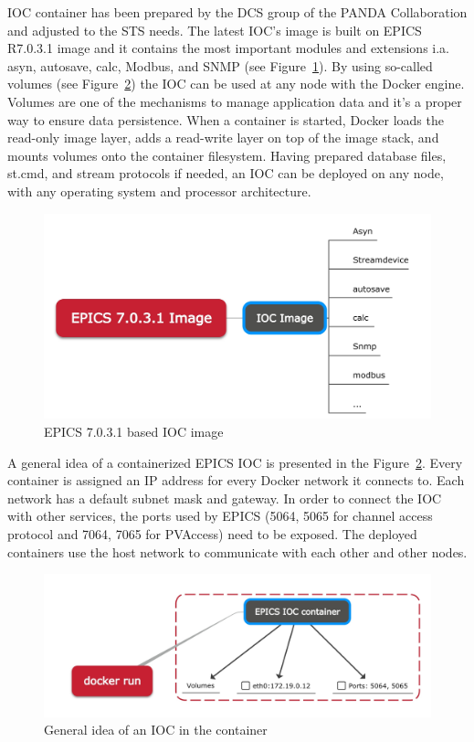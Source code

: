 IOC container has been prepared by the \gls{DCS} group of the \gls{PANDA} Collaboration and adjusted to the \gls{STS} needs. The latest \gls{IOC}'s image is built on EPICS R7.0.3.1 image and it contains the most important modules and extensions i.a. asyn, autosave, calc, Modbus, and SNMP (see Figure~\ref{fig_ioc1}). By using so-called volumes (see Figure~\ref{fig_doc}) the \gls{IOC} can be used at any node with the Docker engine. Volumes are one of the mechanisms to manage application data and it's a proper way to ensure data persistence. When a container is started, Docker loads the read-only image layer, adds a read-write layer on top of the image stack, and mounts volumes onto the container filesystem. Having prepared database files, st.cmd, and stream protocols if needed, an \gls{IOC} can be deployed on any node, with any operating system and processor architecture.
\begin{figure}[!h]
\centering
\includegraphics[width=0.7\columnwidth]{Chapter4/images/epics_ioc.jpg}
\caption{EPICS 7.0.3.1 based \gls{IOC} image}
\label{fig_ioc1}
\end{figure}
\newpage
A general idea of a containerized \gls{EPICS} \gls{IOC} is presented in the Figure~\ref{fig_doc}. Every container is assigned an IP address for every Docker network it connects to. Each network has a default subnet mask and gateway. In order to connect the \gls{IOC} with other services, the ports used by \gls{EPICS} (5064, 5065 for channel access protocol and 7064, 7065 for PVAccess) need to be exposed.  The deployed containers use the host network to communicate with each other and other nodes.
\begin{figure}[!h]
\centering
\includegraphics[width=0.75\columnwidth]{Chapter4/images/docker_run.jpg}
\caption{General idea of an \gls{IOC} in the container}
\label{fig_doc}
\end{figure}
